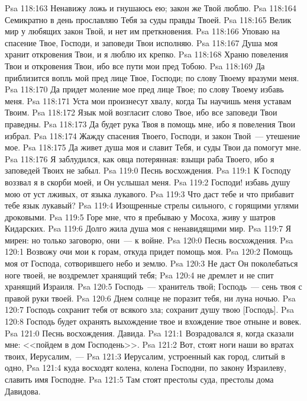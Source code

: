 \vs Psa 118:163 Ненавижу ложь и гнушаюсь ею; закон же Твой люблю.
\vs Psa 118:164 Семикратно в день прославляю Тебя за суды правды Твоей.
\vs Psa 118:165 Велик мир у любящих закон Твой, и нет им преткновения.
\vs Psa 118:166 Уповаю на спасение Твое, Господи, и заповеди Твои исполняю.
\vs Psa 118:167 Душа моя хранит откровения Твои, и я люблю их крепко.
\vs Psa 118:168 Храню повеления Твои и откровения Твои, ибо все пути мои пред Тобою.
\vs Psa 118:169 Да приблизится вопль мой пред лице Твое, Господи; по слову Твоему вразуми меня.
\vs Psa 118:170 Да придет моление мое пред лице Твое; по слову Твоему избавь меня.
\vs Psa 118:171 Уста мои произнесут хвалу, когда Ты научишь меня уставам Твоим.
\vs Psa 118:172 Язык мой возгласит слово Твое, ибо все заповеди Твои праведны.
\vs Psa 118:173 Да будет рука Твоя в помощь мне, ибо я повеления Твои избрал.
\vs Psa 118:174 Жажду спасения Твоего, Господи, и закон Твой~--- утешение мое.
\vs Psa 118:175 Да живет душа моя и славит Тебя, и суды Твои да помогут мне.
\vs Psa 118:176 Я заблудился, как овца потерянная: взыщи раба Твоего, ибо я заповедей Твоих не забыл.
\vs Psa 119:0 Песнь восхождения.
\rsbpar\vs Psa 119:1 К Господу воззвал я в скорби моей, и Он услышал меня.
\vs Psa 119:2 Господи! избавь душу мою от уст лживых, от языка лукавого.
\vs Psa 119:3 Что даст тебе и что прибавит тебе язык лукавый?
\vs Psa 119:4 Изощренные стрелы сильного, с горящими углями дроковыми.
\vs Psa 119:5 Горе мне, что я пребываю у Мосоха, живу у шатров Кидарских.
\vs Psa 119:6 Долго жила душа моя с ненавидящими мир.
\vs Psa 119:7 Я мирен: но только заговорю, они~--- к войне.
\vs Psa 120:0 Песнь восхождения.
\rsbpar\vs Psa 120:1 Возвожу очи мои к горам, откуда придет помощь моя.
\vs Psa 120:2 Помощь моя от Господа, сотворившего небо и землю.
\vs Psa 120:3 Не даст Он поколебаться ноге твоей, не воздремлет хранящий тебя;
\vs Psa 120:4 не дремлет и не спит хранящий Израиля.
\vs Psa 120:5 Господь~--- хранитель твой; Господь~--- сень твоя с правой руки твоей.
\vs Psa 120:6 Днем солнце не поразит тебя, ни луна ночью.
\vs Psa 120:7 Господь сохранит тебя от всякого зла; сохранит душу твою [Господь].
\vs Psa 120:8 Господь будет охранять выхождение твое и вхождение твое отныне и вовек.
\vs Psa 121:0 Песнь восхождения. Давида.
\rsbpar\vs Psa 121:1 Возрадовался я, когда сказали мне: <<пойдем в дом Господень>>.
\vs Psa 121:2 Вот, стоят ноги наши во вратах твоих, Иерусалим,~---
\vs Psa 121:3 Иерусалим, устроенный как город, слитый в одно,
\vs Psa 121:4 куда восходят колена, колена Господни, по закону Израилеву, славить имя Господне.
\vs Psa 121:5 Там стоят престолы суда, престолы дома Давидова.
